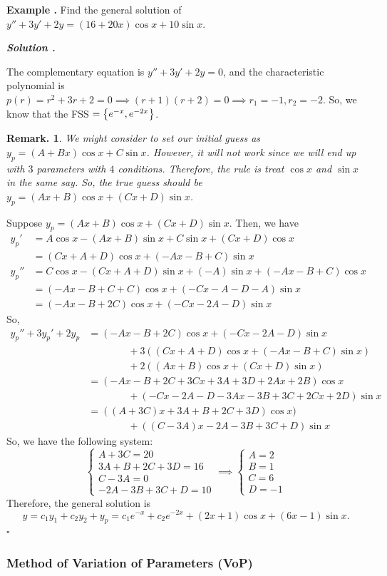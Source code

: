 \documentclass[12pt, a4paper]{article}
\newcounter{index}[subsection]
\newenvironment*{eg}{\begin{framed}\par\noindent\textbf{Example \thesubsection.\stepcounter{index}\theindex}}{\par\end{framed}}
\newcounter{nprf}[subsection]
\newenvironment*{sol}{\par\indent\textbf{\textit{Solution \stepcounter{nprf}\thenprf.}}\par}{\hfill{$\square$}\par}
\newtheorem*{rmk}{Remark.}
\def\C{{\mathbb{C}}}
\begin{document}
\begin{eg}
	Find the general solution of $y''+3y'+2y=(16+20x)\cos{x}+10\sin{x}$.
	\begin{sol}
		The complementary equation is $y''+3y'+2y=0$, and the characteristic polynomial is $p(r)=r^2+3r+2=0\implies(r+1)(r+2)=0\implies r_1=-1,r_2=-2$. So, we know that the FSS $=\qty{e^{-x},e^{-2x}}$. 
		\begin{rmk}
			We might consider to set our initial guess as $y_p=(A+Bx)\cos{x}+C\sin{x}$. However, it will not work since we will end up with $3$ parameters with $4$ conditions. Therefore, the rule is treat $\cos{x}$ and $\sin{x}$ in the same say. So, the true guess should be $y_p=(Ax+B)\cos{x}+(Cx+D)\sin{x}$.
		\end{rmk}
		Suppose  $y_p=(Ax+B)\cos{x}+(Cx+D)\sin{x}$. Then, we have \begin{align*}y_p'&=A\cos{x}-(Ax+B)\sin{x}+C\sin{x}+(Cx+D)\cos{x}\\&=(Cx+A+D)\cos{x}+(-Ax-B+C)\sin{x}\\y_p''&=C\cos{x}-(Cx+A+D)\sin{x}+(-A)\sin{x}+(-Ax-B+C)\cos{x}\\&=(-Ax-B+C+C)\cos{x}+(-Cx-A-D-A)\sin{x}\\&=(-Ax-B+2C)\cos{x}+(-Cx-2A-D)\sin{x}\end{align*} So, \begin{align*}y_p''+3y_p'+2y_p&=(-Ax-B+2C)\cos{x}+(-Cx-2A-D)\sin{x}\\&\qquad\qquad+3((Cx+A+D)\cos{x}+(-Ax-B+C)\sin{x})\\&\qquad\qquad+2((Ax+B)\cos{x}+(Cx+D)\sin{x})\\&=(-Ax-B+2C+3Cx+3A+3D+2Ax+2B)\cos{x}\\&\qquad\qquad+(-Cx-2A-D-3Ax-3B+3C+2Cx+2D)\sin{x}\\&=((A+3C)x+3A+B+2C+3D)\cos{x})\\&\qquad\qquad+((C-3A)x-2A-3B+3C+D)\sin{x}\end{align*} So, we have the following system: \[\begin{cases}A+3C=20\\3A+B+2C+3D=16\\C-3A=0\\-2A-3B+3C+D=10\end{cases}\implies\begin{cases}A=2\\B=1\\C=6\\D=-1\end{cases}\] Therefore, the general solution is \[y=c_1y_1+c_2y_2+y_p=c_1e^{-x}+c_2e^{-2x}+(2x+1)\cos{x}+(6x-1)\sin{x}.\]
	\end{sol}
\end{eg}



\subsubsection{Method of Variation of Parameters (VoP)}
\end{document}

